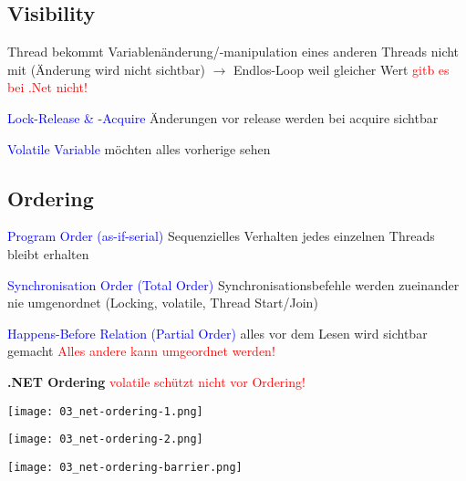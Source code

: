 %
%

\subsection{Visibility}

Thread bekommt Variablenänderung/-manipulation eines anderen Threads nicht mit (Änderung wird nicht sichtbar) $\rightarrow$ Endlos-Loop weil gleicher Wert \textcolor{red}{gitb es bei .Net nicht!}

\textcolor{blue}{Lock-Release \& -Acquire} Änderungen vor release werden bei acquire sichtbar

\textcolor{blue}{Volatile Variable} möchten alles vorherige sehen

\subsection{Ordering}

\textcolor{blue}{Program Order (as-if-serial)} Sequenzielles Verhalten jedes einzelnen Threads bleibt erhalten

\textcolor{blue}{Synchronisation Order (Total Order)} Synchronisationsbefehle werden zueinander nie umgenordnet (Locking, volatile, Thread Start/Join)

\textcolor{blue}{Happens-Before Relation (Partial Order)} alles vor dem Lesen wird sichtbar gemacht \textcolor{red}{Alles andere kann umgeordnet werden!}

\textbf{.NET Ordering} \textcolor{red}{volatile schützt nicht vor Ordering!}

\begin{minipage}[t]{0.3\linewidth}
    \texttt{[image: 03\_net-ordering-1.png]}
\end{minipage}
\begin{minipage}[t]{0.3\linewidth}
    \texttt{[image: 03\_net-ordering-2.png]}
\end{minipage}
\begin{minipage}[t]{0.3\linewidth}
    \texttt{[image: 03\_net-ordering-barrier.png]}
\end{minipage}

